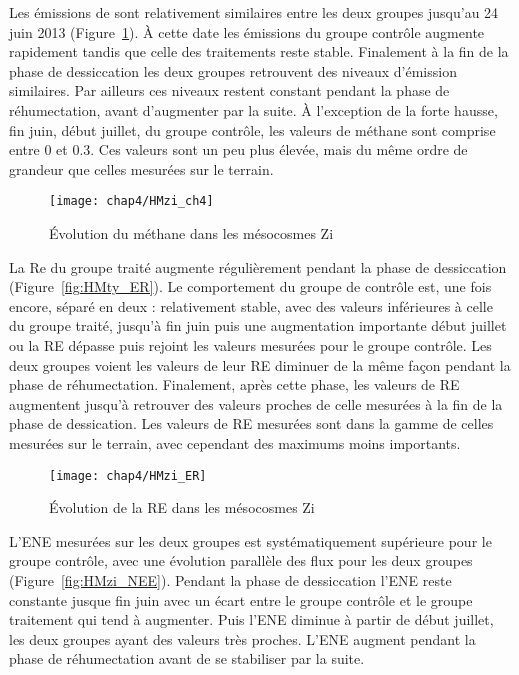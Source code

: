 Les émissions de \chh sont relativement similaires entre les deux groupes jusqu'au 24 juin 2013 (Figure~\ref{fig:HMzi_ch4}).
À cette date les émissions du groupe contrôle augmente rapidement tandis que celle des traitements reste stable.
Finalement à la fin de la phase de dessiccation les deux groupes retrouvent des niveaux d'émission similaires.
Par ailleurs ces niveaux restent constant pendant la phase de réhumectation, avant d'augmenter par la suite.
À l'exception de la forte hausse, fin juin, début juillet, du groupe contrôle, les valeurs de méthane sont comprise entre 0 et \SI{0.3}{\uml}.
Ces valeurs sont un peu plus élevée, mais du même ordre de grandeur que celles mesurées sur le terrain.

\begin{figure}
\centering
\texttt{[image: chap4/HMzi\_ch4]}
\caption{Évolution du méthane dans les mésocosmes Zi}
\label{fig:HMzi_ch4}
\end{figure}

La Re du groupe traité augmente régulièrement pendant la phase de dessiccation (Figure~\ref{fig:HMty_ER}).
Le comportement du groupe de contrôle est, une fois encore, séparé en deux : relativement stable, avec des valeurs inférieures à celle du groupe traité, jusqu'à fin juin puis une augmentation importante début juillet ou la RE dépasse puis rejoint les valeurs mesurées pour le groupe contrôle.
Les deux groupes voient les valeurs de leur RE diminuer de la même façon pendant la phase de réhumectation.
Finalement, après cette phase, les valeurs de RE augmentent jusqu'à retrouver des valeurs proches de celle mesurées à la fin de la phase de dessication.
Les valeurs de RE mesurées sont dans la gamme de celles mesurées sur le terrain, avec cependant des maximums moins importants.

\begin{figure}
\centering
\texttt{[image: chap4/HMzi\_ER]}
\caption{Évolution de la RE dans les mésocosmes Zi}
\label{fig:HMzi_ER}
\end{figure}

L'ENE mesurées sur les deux groupes est systématiquement supérieure pour le groupe contrôle, avec une évolution parallèle des flux pour les deux groupes (Figure~\ref{fig:HMzi_NEE}).
Pendant la phase de dessiccation l'ENE reste constante jusque fin juin avec un écart entre le groupe contrôle et le groupe traitement qui tend à augmenter.
Puis l'ENE diminue à partir de début juillet, les deux groupes ayant des valeurs très proches.
L'ENE augment pendant la phase de réhumectation avant de se stabiliser par la suite.


